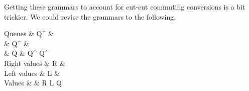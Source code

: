 Getting these grammars to account for cut-cut commuting conversions is a bit trickier. 
%  
% 
% 
% 
We could revise the grammars to the following.
\begin{syntax*}
  Q{}ueues & Q^{\plus} & \selectR{\kay} \mid {} \\
           & Q^{\with} & \selectL{\kay} \mid {} \\
           & Q         & Q^{\with} \mid Q^{\plus} \mid {} \mid {} \\
  Right values & R &  \mid {} \\
   Left values & L &  \mid {} \\
        Values & \enspace\; & R \mid L \mid Q \mid \fwd
\end{syntax*}

